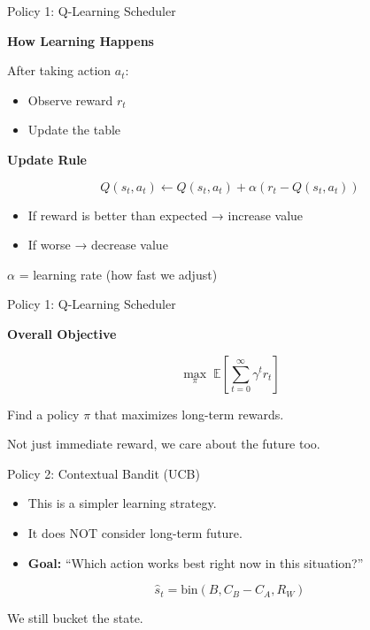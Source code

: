 \documentclass[Serif, 10pt, brown]{beamer}
\theoremstyle{example}
\theoremstyle{plain}
\begin{document}
\begin{frame}{Policy 1: Q-Learning Scheduler}

\textbf{How Learning Happens}

After taking action $a_t$:
\begin{itemize}
    \item Observe reward $r_t$
    \item Update the table
\end{itemize}


\textbf{Update Rule}

\[
Q(s_t, a_t)
\leftarrow
Q(s_t, a_t)
+
\alpha
\left(
r_t - Q(s_t, a_t)
\right)
\]

\begin{itemize}
    \item If reward is better than expected → increase value
    \item If worse → decrease value
\end{itemize}

$\alpha$ = learning rate (how fast we adjust)

\end{frame}

\begin{frame}{Policy 1: Q-Learning Scheduler}

\textbf{Overall Objective}

\[
\max_\pi \; \mathbb{E}
\left[
\sum_{t=0}^{\infty}
\gamma^t r_t
\right]
\]

Find a policy $\pi$ that maximizes long-term rewards.

Not just immediate reward, we care about the future too.

\end{frame}

\begin{frame}{Policy 2: Contextual Bandit (UCB)}

    \begin{itemize}
        \item This is a simpler learning strategy.
        \item It does NOT consider long-term future.
        \item \textbf{Goal:} ``Which action works best right now in this situation?''
    \end{itemize}

\[
\hat{s}_t =
\text{bin}(B, C_B - C_A, R_W)
\]

We still bucket the state.

\end{frame}
\end{document}
